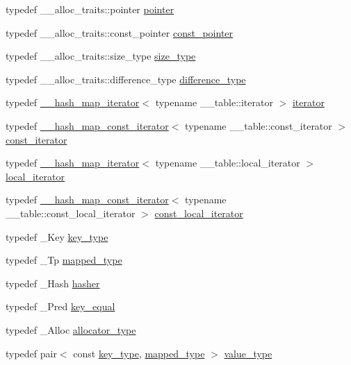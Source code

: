 \begin{DoxyCompactItemize}
\item 
typedef \+\_\+\+\_\+alloc\+\_\+traits\+::pointer \hyperlink{class__map_aaa37e465530f795edf03ac133f0a9a60}{pointer}
\item 
typedef \+\_\+\+\_\+alloc\+\_\+traits\+::const\+\_\+pointer \hyperlink{class__map_a12b2f2762c9383a99c0caf9b2f3ec696}{const\+\_\+pointer}
\item 
typedef \+\_\+\+\_\+alloc\+\_\+traits\+::size\+\_\+type \hyperlink{class__map_adc37f621be25fda072b12873e60e9fc7}{size\+\_\+type}
\item 
typedef \+\_\+\+\_\+alloc\+\_\+traits\+::difference\+\_\+type \hyperlink{class__map_aacdde0553a8fa29ac5cb1678bdf04098}{difference\+\_\+type}
\item 
typedef \hyperlink{class____hash__map__iterator}{\+\_\+\+\_\+hash\+\_\+map\+\_\+iterator}$<$ typename \+\_\+\+\_\+table\+::iterator $>$ \hyperlink{class__map_a9ed817d33532f34fc46649b3fbe8e612}{iterator}
\item 
typedef \hyperlink{class____hash__map__const__iterator}{\+\_\+\+\_\+hash\+\_\+map\+\_\+const\+\_\+iterator}$<$ typename \+\_\+\+\_\+table\+::const\+\_\+iterator $>$ \hyperlink{class__map_ab0513968c2610ccf3b3fe070184396aa}{const\+\_\+iterator}
\item 
typedef \hyperlink{class____hash__map__iterator}{\+\_\+\+\_\+hash\+\_\+map\+\_\+iterator}$<$ typename \+\_\+\+\_\+table\+::local\+\_\+iterator $>$ \hyperlink{class__map_a715fe122a46eecc92c19958b56ed91e4}{local\+\_\+iterator}
\item 
typedef \hyperlink{class____hash__map__const__iterator}{\+\_\+\+\_\+hash\+\_\+map\+\_\+const\+\_\+iterator}$<$ typename \+\_\+\+\_\+table\+::const\+\_\+local\+\_\+iterator $>$ \hyperlink{class__map_aa447944b5b72b05cb3d909f7ac48d2d7}{const\+\_\+local\+\_\+iterator}
\item 
typedef \+\_\+\+Key \hyperlink{class__map_a38e77c21e3aba60e817666c55ff61164}{key\+\_\+type}
\item 
typedef \+\_\+\+Tp \hyperlink{class__map_a652392c4150010664c8b1b76e460ae0a}{mapped\+\_\+type}
\item 
typedef \+\_\+\+Hash \hyperlink{class__map_a1ca536646126d87b3ac0b7fe3aee3534}{hasher}
\item 
typedef \+\_\+\+Pred \hyperlink{class__map_ac341e21272b7041e034855227f1cce49}{key\+\_\+equal}
\item 
typedef \+\_\+\+Alloc \hyperlink{class__map_ab38dd0bcf1867887afc2be61257ef025}{allocator\+\_\+type}
\item 
typedef pair$<$ const \hyperlink{class__map_a38e77c21e3aba60e817666c55ff61164}{key\+\_\+type}, \hyperlink{class__map_a652392c4150010664c8b1b76e460ae0a}{mapped\+\_\+type} $>$ \hyperlink{class__map_a840dcfbf8726d7ecdd0298ffc6afde52}{value\+\_\+type}

\end{DoxyCompactItemize}
